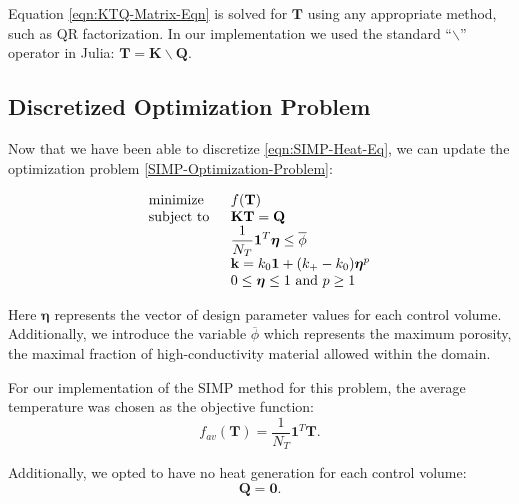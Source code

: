 Equation \eqref{eqn:KTQ-Matrix-Eqn} is solved for $\mathbf{T}$ using any appropriate method, such as QR factorization. In our implementation we used the standard ``$\backslash$'' operator in Julia: $\mathbf{T}=\mathbf{K}\backslash\mathbf{Q}$.

\subsection{Discretized Optimization Problem}

Now that we have been able to discretize \eqref{eqn:SIMP-Heat-Eq}, we can update the optimization problem \eqref{SIMP-Optimization-Problem}:

\begin{equation}
	\begin{tabular}{ll}
		\text{minimize }   & $f(\mathbf{T})$                                                                                     \\
		\text{subject to } & $\mathbf{K}\mathbf{T}=\mathbf{Q}$                                                                   \\
		                   & $\displaystyle\frac{1}{N_T}\mathbf{1}^T\boldsymbol{\eta}\leq\overline{\phi}$ \\
		                   & $\mathbf{k}=k_0\mathbf{1}+(k_+-k_0)\boldsymbol{\eta}^p$                                       \\
		                   & $0\leq\boldsymbol{\eta}\leq 1\text{ and } p\geq 1$
	\end{tabular}\label{Discretized-SIMP-Optimization-Problem}
\end{equation}

Here $\boldsymbol{\eta}$ represents the vector of design parameter values for each control volume. Additionally, we introduce the variable $\overline{\phi}$ which represents the maximum porosity, the maximal fraction of high-conductivity material allowed within the domain.

For our implementation of the SIMP method for this problem, the average temperature was chosen as the objective function:
\begin{equation}
	f_{av}\left(\mathbf{T}\right)=\frac{1}{N_T}\mathbf{1}^T\mathbf{T}.\label{eqn:f_av}
\end{equation}

Additionally, we opted to have no heat generation for each control volume:
\begin{equation}
	\mathbf{Q}=\mathbf{0}.\label{eqn:Q_vec}
\end{equation}

